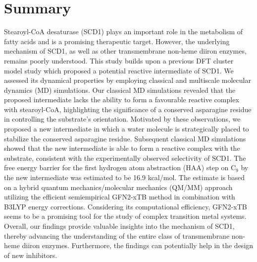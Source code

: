 \chapter*{Summary}
Stearoyl-CoA desaturase (SCD1) plays an important role in the metabolism of fatty acids and is a promising therapeutic target. However, the underlying mechanism of SCD1, as well as other transmembrane non-heme diiron enzymes, remains poorly understood. This study builds upon a previous DFT cluster model study which proposed a potential reactive intermediate of SCD1. We assessed its dynamical properties by employing classical and multiscale molecular dynamics (MD) simulations. Our classical MD simulations revealed that the proposed intermediate lacks the ability to form a favourable reactive complex with stearoyl-CoA, highlighting the significance of a conserved asparagine residue in controlling the substrate's orientation. Motivated by these observations, we proposed a new intermediate in which a water molecule is strategically placed to stabilize the conserved asparagine residue. Subsequent classical MD simulations showed that the new intermediate is able to form a reactive complex with the substrate, consistent with the experimentally observed selectivity of SCD1. The free energy barrier for the first hydrogen atom abstraction (HAA) step on C$_{9}$ by the new intermediate was estimated to be 16.9 kcal/mol. The estimate is based on a hybrid quantum mechanics/molecular mechanics (QM/MM) approach utilizing the efficient semiempirical GFN2-xTB method in combination with B3LYP energy corrections. Considering its computational efficiency, GFN2-xTB seems to be a promising tool for the study of complex transition metal systems. Overall, our findings provide valuable insights into the mechanism of SCD1, thereby advancing the understanding of the entire class of transmembrane non-heme diiron enzymes. Furthermore, the findings can potentially help in the design of new inhibitors.

